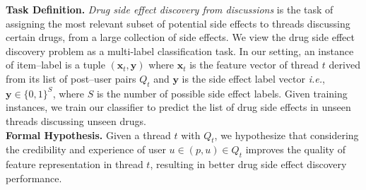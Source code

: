 \documentclass{bmcart}
\begin{document}
{\bf Task Definition.} 
{\it Drug side effect discovery from discussions} 
is the task of assigning the most relevant subset of potential
side effects to threads discussing certain drugs, from a large
collection of side effects. We view the drug side effect
discovery problem as a multi-label classification task. In our
setting, an instance of item--label is a tuple
$\left(\boldsymbol{x}_{t},\boldsymbol{y}\right)$ where
$\boldsymbol{x}_{t}$ is the feature vector of thread $t$ derived from
its list of
post--user pairs $Q_{t}$
and $\boldsymbol{y}$ is the side effect label vector \textit{i.e.}, $\boldsymbol{y}\in\{0, 1\}^S$, where $S$ is the number of possible side effect labels. Given training instances, we train our classifier to predict the list of drug side effects in unseen threads discussing unseen drugs. \\


{\bf Formal Hypothesis.} Given a thread $t$ with $Q_t$, 
we hypothesize that considering the credibility and experience of user $u \in \left(p, u\right) \in Q_t$ improves the quality of feature representation in thread $t$, resulting in better drug side effect discovery performance. 
\end{document}
